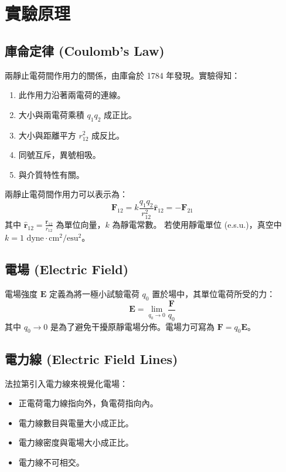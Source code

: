 \section{\textbf{實驗原理}}


\subsection{庫侖定律 (Coulomb's Law)}
兩靜止電荷間作用力的關係，由庫侖於 1784 年發現。實驗得知：
\begin{enumerate}
    \item 此作用力沿著兩電荷的連線。
    \item 大小與兩電荷乘積 $q_1 q_2$ 成正比。
    \item 大小與距離平方 $r_{12}^2$ 成反比。
    \item 同號互斥，異號相吸。
    \item 與介質特性有關。
\end{enumerate}

兩靜止電荷間作用力可以表示為：
\begin{equation}
    \mathbf{F}_{12} = k \frac{q_1 q_2}{r_{12}^2} \hat{\mathbf{r}}_{12} = -\mathbf{F}_{21}
\end{equation}
其中 $\hat{\mathbf{r}}_{12} = \frac{\mathbf{r}_{12}}{r_{12}}$ 為單位向量，$k$ 為靜電常數。
若使用靜電單位 (e.s.u.)，真空中 $k = 1 \text{ dyne} \cdot \text{cm}^2/\text{esu}^2$。



\subsection{電場 (Electric Field)}
電場強度 $\mathbf{E}$ 定義為將一極小試驗電荷 $q_0$ 置於場中，其單位電荷所受的力：
\begin{equation}
    \mathbf{E} = \lim_{q_0 \to 0} \frac{\mathbf{F}}{q_0}
\end{equation}
其中 $q_0 \to 0$ 是為了避免干擾原靜電場分佈。電場力可寫為 $\mathbf{F} = q_0 \mathbf{E}$。

\newpage

\subsection{電力線 (Electric Field Lines)}
法拉第引入電力線來視覺化電場：
\begin{itemize}
    \item 正電荷電力線指向外，負電荷指向內。
    \item 電力線數目與電量大小成正比。
    \item 電力線密度與電場大小成正比。
    \item 電力線不可相交。
\end{itemize}






